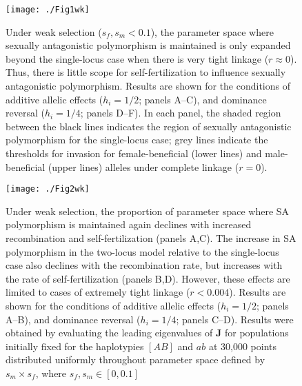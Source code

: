 \documentclass{article}
\begin{document}
\begin{figure}[h!]
\texttt{[image: ./Fig1wk]}
\caption{Under weak selection ($s_f,s_m < 0.1$), the parameter space where sexually antagonistic polymorphism is maintained is only expanded beyond the single-locus case when there is very tight linkage ($r \approx 0$). Thus, there is little scope for self-fertilization to influence sexually antagonistic polymorphism. Results are shown for the conditions of additive allelic effects ($h_i = 1/2$; panels A--C), and dominance reversal ($h_i = 1/4$; panels D--F). In each panel, the shaded region between the black lines indicates the region of sexually antagonistic polymorphism for the single-locus case; grey lines indicate the thresholds for invasion for female-beneficial (lower lines) and male-beneficial (upper lines) alleles under complete linkage ($r = 0$).}
\label{fig:wkFunnelPlots}
\end{figure}
\newpage{}


\begin{figure}[h!]
\texttt{[image: ./Fig2wk]}
\caption{Under weak selection, the proportion of parameter space where SA polymorphism is maintained again declines with increased recombination and self-fertilization (panels A,C). The increase in SA polymorphism in the two-locus model relative to the single-locus case also declines with the recombination rate, but increases with the rate of self-fertilization (panels B,D). However, these effects are limited to cases of extremely tight linkage ($r < 0.004$). Results are shown for the conditions of additive allelic effects ($h_i = 1/2$; panels A--B), and dominance reversal ($h_i = 1/4$; panels C--D). Results were obtained by evaluating the leading eigenvalues of $\mathbf{J}$ for populations initially fixed for the haplotypies $[AB]$ and $ab$ at 30,000 points distributed uniformly throughout parameter space defined by $s_m \times s_f$, where $s_f,s_m \in [0,0.1]$}
\label{fig:wkPolymorhism}
\end{figure}

\newpage


\end{document}
